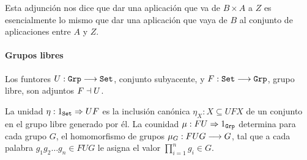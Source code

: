 Esta adjunción nos dice que dar una aplicación que va de $B\times A$ a $Z$
es esencialmente lo mismo que dar una aplicación que vaya de $B$ al conjunto
de aplicaciones entre $A$ y $Z$.
\paragraph{Grupos libres}
Los funtores $U : \texttt{Grp}\longrightarrow \texttt{Set}$, conjunto subyacente,
y $F : \texttt{Set}\longrightarrow \texttt{Grp}$, grupo libre, son adjuntos
$F \dashv U$.

La unidad $\eta : 1_{\texttt{Set}}\Rightarrow UF$ es la inclusión canónica
$\eta_X : X \subseteq UFX$ de un conjunto en el
grupo libre generado por él. La counidad
$\mu : FU\Rightarrow 1_{\texttt{Grp}}$ determina para cada grupo $G$,
el homomorfismo de grupos $\mu_G : FUG\longrightarrow G$,
tal que a cada palabra
$g_1g_2\ldots g_n \in FUG$ le asigna el valor $\prod_{i=1}^n g_i \in G$.
